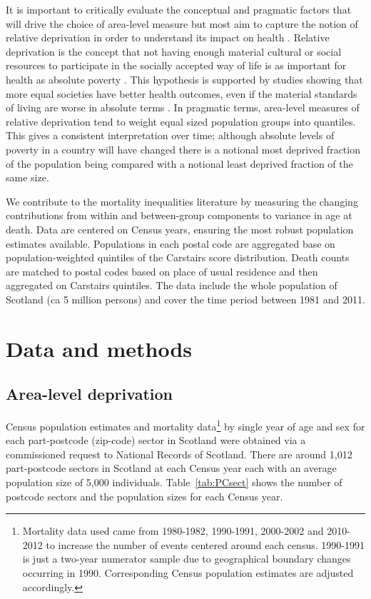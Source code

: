 \documentclass[12pt,oneside,a4paper]{article} %
\theoremstyle{definition}
\begin{document}
It is important to critically evaluate the conceptual and pragmatic factors that will drive the choice of area-level measure but most aim to capture the notion of relative deprivation in order to understand its impact on health \citep{kearns2000,Morgan2006}. Relative deprivation is the concept that not having enough material cultural
or social resources to participate in the socially accepted way of life is as important for health as absolute poverty \citep{Townsend1987,Carstairs1989,kearns2000,Kawachi2002}. This hypothesis is supported by studies showing that more equal societies have better health outcomes, even if the material standards of living are worse in absolute terms \citep{Wilkinson1997,Marmot2001,Wilkinson2007}. In pragmatic terms, area-level measures of relative deprivation tend to weight equal sized population groups into quantiles. This gives a
consistent interpretation over time; although
absolute levels of poverty in a country will have changed there is a notional
most deprived fraction of the population being compared with a notional least deprived fraction of the same size. 


We contribute to the mortality inequalities literature by measuring the changing contributions from within and
between-group components to variance in age at death. Data are centered on
Census years, ensuring the most robust population estimates available.
Populations in each postal code are aggregated base on population-weighted
quintiles of the Carstairs score distribution. Death counts are
matched to postal codes based on place of usual residence and then aggregated
on Carstairs quintiles. The data include the whole population of Scotland (ca 5
million persons) and cover the time period between 1981 and 2011.

\section{Data and methods}

\subsection{Area-level deprivation}
Census population estimates and mortality data\footnote{Mortality data used
came from 1980-1982, 1990-1991, 2000-2002 and 2010-2012 to increase the
number of events centered around each census. 1990-1991 is just a two-year
numerator sample due to geographical boundary changes occurring in 1990.
Corresponding Census population estimates are adjusted accordingly.} by single
year of age and sex for each part-postcode (zip-code) sector in Scotland were
obtained via a commissioned request to National Records of Scotland. There are
around 1,012 part-postcode sectors in Scotland at each Census year each with an
average population size of 5,000 individuals. Table~\ref{tab:PCsect} shows the number of postcode sectors and the population sizes for each Census year.
\end{document}
